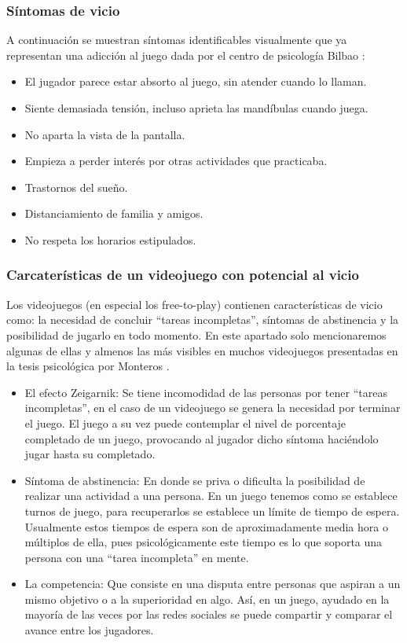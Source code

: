 \subsubsection{Síntomas de vicio}
A continuación se muestran síntomas identificables visualmente que ya representan una adicción al juego dada por el centro de psicología Bilbao \cite{centrodepsicologiabilbaos.l.p.}:
\begin{itemize}
	\item El jugador parece estar absorto al juego, sin atender cuando lo llaman.
	\item Siente demasiada tensión, incluso aprieta las mandíbulas cuando juega.
	\item No aparta la vista de la pantalla.
	\item Empieza a perder interés por otras actividades que practicaba.
	\item Trastornos del sueño.
	\item Distanciamiento de familia y amigos.
	\item No respeta los horarios estipulados.
\end{itemize}


\subsubsection{Carcaterísticas de un videojuego con potencial al vicio}
Los videojuegos (en especial los free-to-play) contienen características de vicio como: la necesidad de concluir “tareas incompletas”, síntomas de abstinencia y la posibilidad de jugarlo en todo momento. En este apartado solo mencionaremos algunas de ellas y almenos las más visibles en muchos videojuegos presentadas en la tesis psicológica por Monteros \cite{montero2014ocios}.

 \begin{itemize}
 	\item El efecto Zeigarnik: Se tiene incomodidad de las personas por tener “tareas incompletas”, en el caso de un videojuego se genera la necesidad por terminar el juego. El juego a su vez puede contemplar el nivel de porcentaje completado de un juego, provocando al jugador dicho síntoma haciéndolo jugar hasta su completado.
 	
 	\item Síntoma de abstinencia: En donde se priva o dificulta la posibilidad de realizar una actividad a una persona. En un juego tenemos como se establece turnos de juego, para recuperarlos se establece un límite de tiempo de espera. Usualmente estos tiempos de espera son de aproximadamente media hora o múltiplos de ella, pues psicológicamente este tiempo es lo que soporta una persona con una “tarea incompleta” en mente.
 	
 	\item La competencia: Que consiste en una disputa entre personas que aspiran a un mismo objetivo o a la superioridad en algo. Así, en un juego, ayudado en la mayoría de las veces por las redes sociales se puede compartir y comparar el avance entre los jugadores.
 	 \\[1pt]
 	
 \end{itemize}

